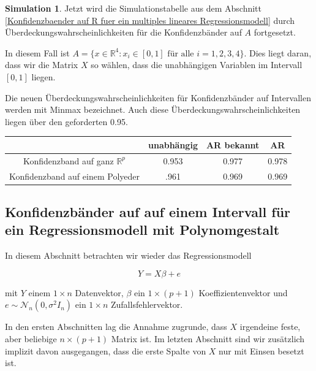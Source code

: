 \documentclass[12pt,a4paper]{article}
\theoremstyle{definition}
\theoremstyle{definition}
\theoremstyle{definition}
\newtheorem{Simulation}[Definition]{Simulation}
\theoremstyle{definition}
\newcommand{\UeberRR}{0.953}
\newcommand{\UeberRMinmax}{.961}
\newcommand{\UeberARbekanntR}{0.977}
\newcommand{\UeberARbekanntMinmax}{0.969}
\newcommand{\UeberARR}{0.978}
\newcommand{\UeberARMinmax}{0.969}
\begin{document}
\begin{Simulation}
Jetzt wird die Simulationstabelle aus dem Abschnitt \ref{Konfidenzbaender auf R fuer ein multiples lineares Regressionsmodell} durch Überdeckungswahrscheinlichkeiten für die Konfidenzbänder auf $A$ fortgesetzt. 

In diesem Fall ist $A = \{x \in \mathbb{R}^4 : x_i \in [0,1] \text{ für alle } i=1, 2, 3, 4 \}$. Dies liegt daran, dass wir die Matrix $X$ so wählen, dass die unabhängigen Variablen im Intervall $[0,1]$ liegen.

Die neuen Überdeckungswahrscheinlichkeiten für Konfidenzbänder auf Intervallen werden mit Minmax bezeichnet. Auch diese Überdeckungswahrscheinlichkeiten liegen über den geforderten 0.95.

\begin{center}
\begin{tabular}{|c|c|c|c|}
\hline 
 & unabhängig & AR bekannt & AR \\ 
\hline 
Konfidenzband auf ganz $\mathbb{R}^{p}$		 & \UeberRR		  & \UeberARbekanntR & \UeberARR \\ 
\hline 
Konfidenzband auf einem Polyeder	 & \UeberRMinmax  & \UeberARbekanntMinmax & \UeberARMinmax \\ 
\hline 
\end{tabular} 
\end{center}

\end{Simulation}


\newpage
\subsection{Konfidenzbänder auf auf einem Intervall für ein Regressionsmodell mit Polynomgestalt}
\label{Konfidenzbaenderauf auf einem Intervall für Regressionsmodell mit Polynomgestalt}
In diesem Abschnitt betrachten wir wieder das Regressionsmodell 

\begin{equation*}
Y=X\beta+e
\end{equation*}

mit $Y$ einem $1 \times n$ Datenvektor, $\beta$ ein $1 \times (p+1)$ Koeffizientenvektor und $e \sim \mathscr{N}_{n}(0,\sigma^2 I_n )$ ein $1 \times n$ Zufallsfehlervektor.

In den ersten Abschnitten lag die Annahme zugrunde, dass $X$ irgendeine feste, aber beliebige $n \times (p+1)$ Matrix ist. Im letzten Abschnitt sind wir zusätzlich implizit davon ausgegangen, dass die erste Spalte von $X$ nur mit Einsen besetzt ist.
\end{document}

